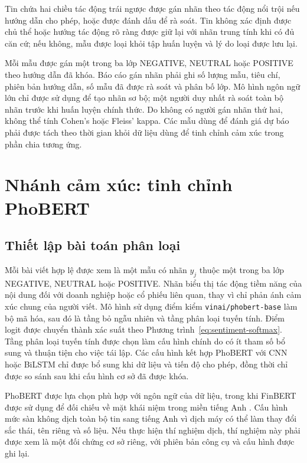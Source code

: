 \documentclass[12pt, a4paper, oneside]{report}
\begin{document}
Tin chứa hai chiều tác động trái ngược được gán nhãn theo tác động nổi trội nếu hướng
dẫn cho phép, hoặc được đánh dấu để rà soát. Tin không xác định được chủ thể hoặc hướng
tác động rõ ràng được giữ lại với nhãn trung tính khi có đủ căn cứ; nếu không, mẫu được
loại khỏi tập huấn luyện và lý do loại được lưu lại.

Mỗi mẫu được gán một trong ba lớp NEGATIVE, NEUTRAL hoặc POSITIVE theo hướng dẫn đã
khóa. Báo cáo gán nhãn phải ghi số lượng mẫu, tiêu chí, phiên bản hướng dẫn, số mẫu đã
được rà soát và phân bố lớp. Mô hình ngôn ngữ lớn chỉ được sử dụng để tạo nhãn sơ bộ;
một người duy nhất rà soát toàn bộ nhãn trước khi huấn luyện chính thức. Do không có
người gán nhãn thứ hai, không thể tính Cohen's hoặc Fleiss' kappa. Các mẫu dùng để
đánh giá dự báo phải được tách theo thời gian khỏi dữ liệu dùng để tinh chỉnh cảm xúc
trong phần chia tương ứng.
\section{Nhánh cảm xúc: tinh chỉnh PhoBERT}
\label{sec:pp-phobert}

\subsection{Thiết lập bài toán phân loại}

Mỗi bài viết hợp lệ được xem là một mẫu có nhãn $y_j$ thuộc một trong ba lớp NEGATIVE, NEUTRAL
hoặc POSITIVE. Nhãn biểu thị tác động tiềm năng của nội dung đối với doanh nghiệp hoặc cổ phiếu
liên quan, thay vì chỉ phản ánh cảm xúc chung của người viết. Mô hình sử dụng điểm kiểm
\texttt{vinai/phobert-base} làm bộ mã hóa, sau đó là tầng bỏ ngẫu nhiên và tầng phân loại tuyến
tính. Điểm logit được chuyển thành xác suất theo Phương trình~\ref{eq:sentiment-softmax}.
Tầng phân loại tuyến tính được chọn làm cấu hình chính do có ít tham số bổ sung và thuận tiện
cho việc tái lập. Các cấu hình kết hợp PhoBERT với CNN hoặc BiLSTM chỉ được bổ sung khi dữ
liệu và tiến độ cho phép, đồng thời chỉ được so sánh sau khi cấu hình cơ sở đã được khóa.

PhoBERT được lựa chọn phù hợp với ngôn ngữ của dữ liệu, trong khi FinBERT được sử dụng để
đối chiếu về mặt khái niệm trong miền tiếng Anh
\cite{Nguyen2020_200300744v3,Yang2020_200608097v2}. Cấu hình mức sàn không dịch toàn bộ
tin sang tiếng Anh vì dịch máy có thể làm thay đổi sắc thái, tên riêng và số liệu. Nếu thực
hiện thí nghiệm dịch, thí nghiệm này phải được xem là một đối chứng cơ sở riêng, với phiên bản công cụ và cấu hình được ghi lại.
\end{document}
